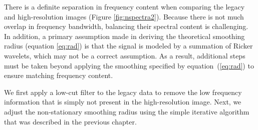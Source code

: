     There is a definite separation in frequency content when comparing the legacy and high-resolution images (Figure \ref{fig:nspectra2}). 
    Because there is not much overlap in frequency bandwidth, balancing their spectral content is challenging. 
    In addition, a primary assumption made in deriving the theoretical smoothing radius (equation \ref{eq:rad}) is that the signal is modeled by a summation of Ricker wavelets, which may not be a correct assumption. 
    As a result, additional steps must be taken beyond applying the smoothing specified by equation~(\ref{eq:rad}) to ensure matching frequency content. 
    
    
    We first apply a low-cut filter to the legacy data to remove the low frequency information that is simply not present in the high-resolution image. 
    Next, we adjust the non-stationary smoothing radius using the simple iterative algorithm \cite[]{locfreq} that was described in the previous chapter. 
    
